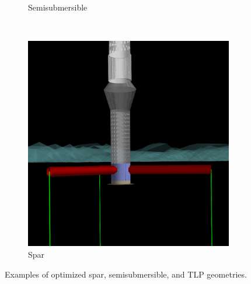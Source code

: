 \begin{figure}[htb]
\begin{subfigure}[b]{0.39\linewidth}
    \caption{Semisubmersible}
  \end{subfigure}\\
  \begin{subfigure}[b]{0.29\linewidth}
    \centering \includegraphics[width=\linewidth]{figs/tlp-cost2.png}
    \caption{Spar}
  \end{subfigure}
  \caption{Examples of optimized spar, semisubmersible, and TLP geometries.}
  \label{fig:optex}
\end{figure}

